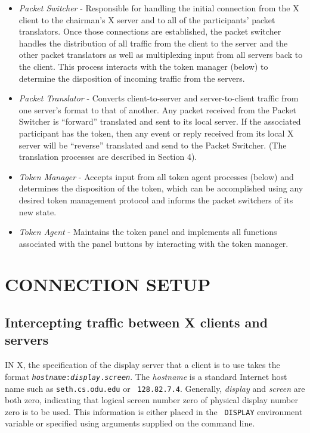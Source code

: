 \begin{itemize}

\item {\it Packet Switcher} - Responsible for handling the initial
connection from the X client to the chairman's X server and to all of
the participants' packet translators.  Once those connections are
established, the packet switcher handles the distribution of all
traffic from the client to the server and the other packet translators
as well as multiplexing input from all servers back to the client.
This process interacts with the token manager (below) to determine the
disposition of incoming traffic from the servers.

\item {\it Packet Translator} - Converts client-to-server and
server-to-client traffic from one server's format to that of another.
Any packet received from the Packet Switcher is
``forward'' translated  and sent to its
local server. If the associated participant has the token, then any
event or reply received from its local X server will be ``reverse''
translated and send to the Packet Switcher.
(The translation processes are described in Section 4).

\item {\it Token Manager} - Accepts input from all token agent
processes (below) and determines the disposition of the token, which
can be accomplished using any desired token management
protocol \cite{Abdel-Wahab88} and informs the packet switchers of its
new state.

\item {\it Token Agent} - Maintains the token panel and implements all
functions associated with the panel buttons by interacting with the
token manager.

\end{itemize}
%
%
\section{CONNECTION SETUP}

\subsection{Intercepting traffic between X clients and servers}

IN X, the specification of the display server that a  client is to use 
takes the
format {\tt {\it hostname}:{\it display}.{\it screen}}.  The {\it hostname}
is a standard Internet host name such as {\tt seth.cs.odu.edu} or {\tt
128.82.7.4}.  Generally, {\it display} and {\it screen} are both zero,
indicating that logical screen number zero of physical display number
zero is to be used.  This information is either placed in the {\tt
DISPLAY} environment variable or specified using arguments supplied on
the command line.

